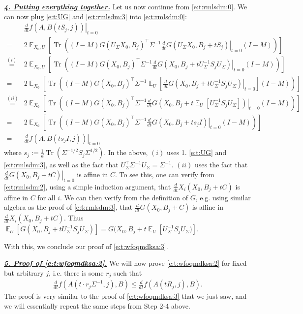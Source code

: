 \documentclass{article}
\DeclareMathOperator{\E}{\mathbb{E}}
\newcommand{\emphh}[1]{\textbf{\emph{#1}}}
\DeclareMathOperator{\tr}{Tr}
\newcommand*\lrb[1]{\left[ #1 \right]}
\newcommand*\lrp[1]{\left( #1 \right)}
\newcommand*\at[2]{\left.#1\right|_{#2}}
\newcommand{\US}{U_\Sigma}
\begin{document}
\underline{\emphh{4. Putting everything together.}}
Let us now continue from \eqref{e:t:rmlsdm:0}. We can now plug \eqref{e:t:UG} and \eqref{e:t:rmlsdm:3} into \eqref{e:t:rmlsdm:0}:
{\allowdisplaybreaks
\begin{align*}
& \at{\frac{d}{dt} f(A, B(tS_j,j))}{t=0}\\
=& 2\E_{X_0, U} \lrb{\tr\lrp{\lrp{I-M} G(\US X_0, B_j )^\top \Sigma^{-1} \at{\frac{d}{dt} G(\US X_0, B_j + t S_j)}{t=0} \lrp{I-M}}}\\
\overset{(i)}{=}& 2\E_{X_0, U} \lrb{\tr\lrp{\lrp{I-M} G( X_0, B_j )^\top \Sigma^{-1} \at{\frac{d}{dt} G(X_0, B_j + t \US^{-1} S_j \US)}{t=0} \lrp{I-M}}}\\
=& 2\E_{X_0} \lrb{\tr\lrp{\lrp{I-M} G( X_0, B_j )^\top \Sigma^{-1} \E_{U}\lrb{\at{\frac{d}{dt} G(X_0, B_j + t \US^{-1} S_j \US)}{t=0}} \lrp{I-M}}}\\
\overset{(ii)}{=}& 2\E_{X_0} \lrb{\tr\lrp{\lrp{I-M} G( X_0, B_j )^\top \Sigma^{-1} \at{\frac{d}{dt} G(X_0, B_j + t \E_U\lrb{\US^{-1} S_j \US} )}{t=0} \lrp{I-M}}}\\
=& 2\E_{X_0} \lrb{\tr\lrp{\lrp{I-M} G( X_0, B_j )^\top \Sigma^{-1} \at{\frac{d}{dt} G(X_0, B_j + t s_j I)}{t=0} \lrp{I-M}}}\\
=& \at{\frac{d}{dt} f(A, B(ts_j I,j))}{t=0}
\end{align*}
}
where $s_j := \frac{1}{d} \tr\lrp{\Sigma^{-1/2} S_j \Sigma^{1/2}}$. In the above, $(i)$ uses 1. \eqref{e:t:UG} and \eqref{e:t:rmlsdm:3}, as well as the fact that $\US^\top \Sigma^{-1} \US = \Sigma^{-1}$. $(ii)$ uses the fact that $\at{\frac{d}{dt} G(X_0, B_j + t C)}{t=0}$ is affine in $C$. To see this, one can verify from \eqref{e:t:rmlsdm:2}, using a simple induction argument, that $\frac{d}{dt} X_i(X_0, B_j + tC)$  is affine in $C$ for all $i$. We can then verify from the definition of $G$, e.g. using similar algebra as the proof of \eqref{e:t:rmlsdm:3}, that $\frac{d}{dt} G(X_0, B_j + C)$ is affine in $\frac{d}{dt} X_i(X_0, B_j + t C)$. Thus $\E_U\lrb{G(X_0, B_j + t \US^{-1} S_j \US)} = G(X_0, B_j + t \E_U\lrb{\US^{-1} S_j \US)}$.

With this, we conclude our proof of \eqref{e:t:wfoqmdksa:3}.

\underline{\emphh{5. Proof of \eqref{e:t:wfoqmdksa:2}.}}
We will now prove \eqref{e:t:wfoqmdksa:2} for fixed but arbitrary $j$, i.e. there is some $r_j$ such that
\begin{align*}
\frac{d}{dt} f(A(t\cdot r_j \Sigma^{-1},j), B) \leq \frac{d}{dt} f(A(tR_j,j), B).
\end{align*}
The proof is very similar to the proof of \eqref{e:t:wfoqmdksa:3} that we just saw, and we will essentially repeat the same steps from Step 2-4 above. 
\end{document}
